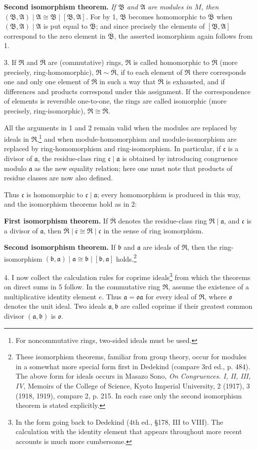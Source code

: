 \documentclass[11pt]{article}
\providecommand{\mR}{\mathfrak{R}}
\providecommand{\mA}{\mathfrak{A}}
\providecommand{\mB}{\mathfrak{B}}
\providecommand{\ma}{\mathfrak{a}}
\providecommand{\mb}{\mathfrak{b}}
\providecommand{\mc}{\mathfrak{c}}
\providecommand{\mo}{\mathfrak{o}}
\begin{document}
\textbf{Second isomorphism theorem.} \emph{If $\mB$ and $\mA$ are modules in $M$, then $(\mB,\mA)\mid\mA\cong\mB\mid[\mB,\mA]$.} For by 1, $\mB$ becomes homomorphic to $\overline{\mB}$ when $(\mB,\mA)\mid\mA$ is put equal to $\overline{\mB}$; and since precisely the elements of $[\mB,\mA]$ correspond to the zero element in $\overline{\mB}$, the asserted isomorphism again follows from 1.

3. If $\mR$ and $\overline{\mR}$ are (commutative) rings, $\mR$ is called homomorphic to $\overline{\mR}$ (more precisely, ring-homomorphic), $\mR\sim\overline{\mR}$, if to each element of $\mR$ there corresponds one and only one element of $\overline{\mR}$ in such a way that $\overline{\mR}$ is exhausted, and if differences and products correspond under this assignment. If the correspondence of elements is reversible one-to-one, the rings are called isomorphic (more precisely, ring-isomorphic), $\mR\cong\overline{\mR}$.

All the arguments in 1 and 2 remain valid when the modules are replaced by ideals in $\mR$,\footnote{For noncommutative rings, two-sided ideals must be used.} and when module-homomorphism and module-isomorphism are replaced by ring-homomorphism and ring-isomorphism. In particular, if $\mc$ is a divisor of $\ma$, the residue-class ring $\mc\mid\ma$ is obtained by introducing congruence modulo $\ma$ as the new equality relation; here one must note that products of residue classes are now also defined.

Thus $\mc$ is homomorphic to $\mc\mid\ma$; every homomorphism is produced in this way, and the isomorphism theorems hold as in 2:

\textbf{First isomorphism theorem.} If $\overline{\mR}$ denotes the residue-class ring $\mR\mid\ma$, and $\mc$ is a divisor of $\ma$, then $\overline{\mR}\mid\overline{\mc}\cong\mR\mid\mc$ in the sense of ring isomorphism.

\textbf{Second isomorphism theorem.} If $\mb$ and $\ma$ are ideals of $\mR$, then the ring-isomorphism $(\mb,\ma)\mid\ma\cong\mb\mid[\mb,\ma]$ holds.\footnote{These isomorphism theorems, familiar from group theory, occur for modules in a somewhat more special form first in Dedekind (compare 3rd ed., p. 484). The above form for ideals occurs in Masazo Sono, \emph{On Congruences. I, II, III, IV}, Memoirs of the College of Science, Kyoto Imperial University, 2 (1917), 3 (1918, 1919), compare 2, p. 215. In each case only the second isomorphism theorem is stated explicitly.}

4. I now collect the calculation rules for coprime ideals\footnote{In the form going back to Dedekind (4th ed., §178, III to VIII). The calculation with the identity element that appears throughout more recent accounts is much more cumbersome.} from which the theorems on direct sums in 5 follow. In the commutative ring $\mR$, assume the existence of a multiplicative identity element $e$. Thus $\ma=\mo\ma$ for every ideal of $\mR$, where $\mo$ denotes the unit ideal. Two ideals $\ma,\mb$ are called coprime if their greatest common divisor $(\ma,\mb)$ is $\mo$.
\end{document}
